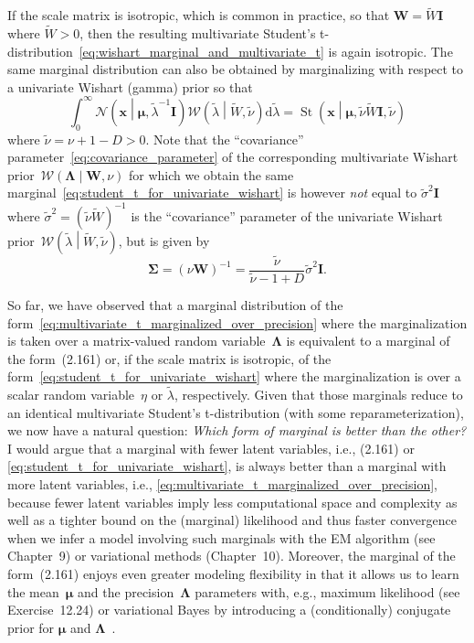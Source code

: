\documentclass[12pt,a4paper]{article}
\begin{document}
If the scale matrix is isotropic, which is common in practice,
so that $\mathbf{W} = \widetilde{W}\mathbf{I}$ where $\widetilde{W} > 0$, then the resulting
multivariate Student's t-distribution~\eqref{eq:wishart_marginal_and_multivariate_t}
is again isotropic.
The same marginal distribution can also be obtained by marginalizing
with respect to a univariate Wishart (gamma) prior so that
\begin{equation}
\int_{0}^{\infty}
\mathcal{N}\left(\mathbf{x}\middle|\bm{\mu}, \widetilde{\lambda}^{-1}\mathbf{I}\right)
\mathcal{W}\left(\widetilde{\lambda}\middle|\widetilde{W}, \widetilde{\nu}\right)
\mathrm{d}\widetilde{\lambda}
= \operatorname{St}\left(\mathbf{x} \middle|
\bm{\mu}, \widetilde{\nu} \widetilde{W} \mathbf{I}, \widetilde{\nu} \right)
\label{eq:student_t_for_univariate_wishart}
\end{equation}
where $\widetilde{\nu} = \nu + 1 - D > 0$.
Note that the ``covariance'' parameter~\eqref{eq:covariance_parameter} of
the corresponding multivariate
Wishart prior~$\mathcal{W}\left(\bm{\Lambda}\middle|\mathbf{W}, \nu\right)$
for which we obtain the same marginal~\eqref{eq:student_t_for_univariate_wishart}
is however \emph{not} equal to $\widetilde{\sigma}^{2} \mathbf{I}$
where $\widetilde{\sigma}^{2} = \left(\widetilde{\nu}\widetilde{W}\right)^{-1}$ is
the ``covariance'' parameter of the univariate Wishart
prior~$\mathcal{W}\left(\widetilde{\lambda}\middle|\widetilde{W}, \widetilde{\nu}\right)$,
but is given by
\begin{equation}
\bm{\Sigma} = \left(\nu\mathbf{W}\right)^{-1} =
\frac{\widetilde{\nu}}{\widetilde{\nu} - 1 + D} \widetilde{\sigma}^{2} \mathbf{I} .
\end{equation}

So far, we have observed that a marginal
distribution of the form~\eqref{eq:multivariate_t_marginalized_over_precision}
where the marginalization is taken over a matrix-valued random variable~$\bm{\Lambda}$ is
equivalent to a marginal of the form~(2.161) or, if the scale matrix is isotropic,
of the form~\eqref{eq:student_t_for_univariate_wishart} where the marginalization is over
a scalar random variable~$\eta$ or $\widetilde{\lambda}$, respectively.
Given that those marginals reduce to an identical multivariate Student's t-distribution
(with some reparameterization),
we now have a natural question: \emph{Which form of marginal is better than the other?}
I would argue that a marginal with fewer latent variables,
i.e., (2.161) or \eqref{eq:student_t_for_univariate_wishart},
is always better than a marginal with more latent variables,
i.e., \eqref{eq:multivariate_t_marginalized_over_precision},
because fewer latent variables imply less computational space and complexity as well as
a tighter bound on the (marginal) likelihood and thus faster convergence
when we infer a model involving such marginals with the EM algorithm (see Chapter~9) or
variational methods (Chapter~10).
Moreover, the marginal of the form~(2.161) enjoys even greater modeling flexibility in that
it allows us to learn the mean~$\bm{\mu}$ and the precision~$\bm{\Lambda}$ parameters
with, e.g., maximum likelihood (see Exercise~12.24) or
variational Bayes by introducing a (conditionally) conjugate prior for
$\bm{\mu}$ and $\bm{\Lambda}$~\citep{Svensen:RobustMixture}.
\end{document}
